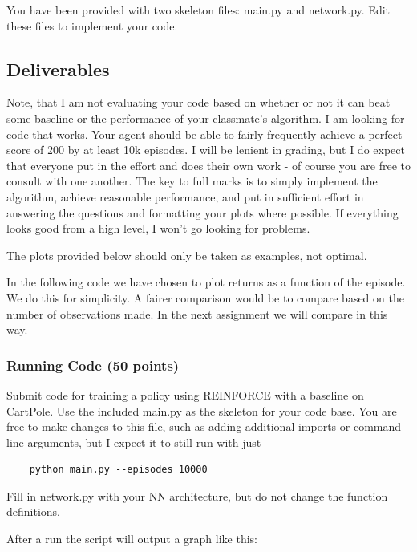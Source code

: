 \documentclass{article}
\begin{document}
You have been provided with two skeleton files: main.py and network.py. Edit these files to implement your code.

\subsection{Deliverables}

Note, that I am not evaluating your code based on whether or not it can beat some baseline or the performance of your classmate's algorithm. I am looking for code that works. Your agent should be able to fairly frequently achieve a perfect score of 200 by at least 10k episodes. I will be lenient in grading, but I do expect that everyone put in the effort and does their own work - of course you are free to consult with one another. The key to full marks is to simply implement the algorithm, achieve reasonable performance, and put in sufficient effort in answering the questions and formatting your plots where possible. If everything looks good from a high level, I won't go looking for problems.

The plots provided below should only be taken as examples, not optimal.

In the following code we have chosen to plot returns as a function of the episode. We do this for simplicity. A fairer comparison would be to compare based on the number of observations made. In the next assignment we will compare in this way.

\subsubsection{Running Code (50 points)}

Submit code for training a policy using REINFORCE with a baseline on CartPole. Use the included main.py as the skeleton for your code base. You are free to make changes to this file, such as adding additional imports or command line arguments, but I expect it to still run with just

\begin{verbatim}
    python main.py --episodes 10000
\end{verbatim}

Fill in network.py with your NN architecture, but do not change the function definitions.

After a run the script will output a graph like this: 
\end{document}
